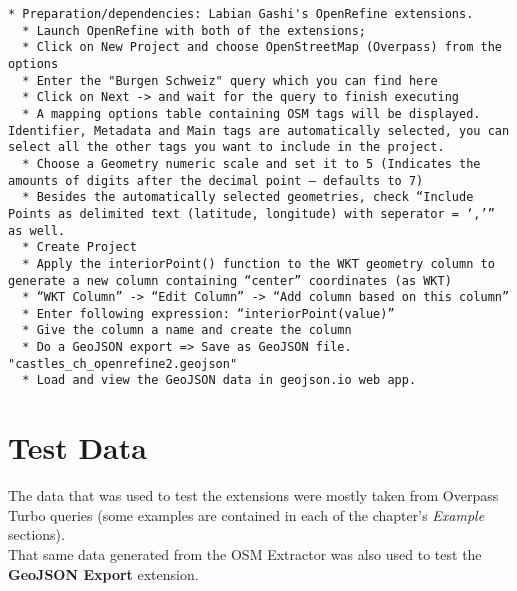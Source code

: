 \begin{verbatim}
* Preparation/dependencies: Labian Gashi's OpenRefine extensions.
  * Launch OpenRefine with both of the extensions;
  * Click on New Project and choose OpenStreetMap (Overpass) from the options
  * Enter the "Burgen Schweiz" query which you can find here
  * Click on Next -> and wait for the query to finish executing
  * A mapping options table containing OSM tags will be displayed. Identifier, Metadata and Main tags are automatically selected, you can select all the other tags you want to include in the project.
  * Choose a Geometry numeric scale and set it to 5 (Indicates the amounts of digits after the decimal point – defaults to 7)
  * Besides the automatically selected geometries, check “Include Points as delimited text (latitude, longitude) with seperator = ‘,’” as well.
  * Create Project
  * Apply the interiorPoint() function to the WKT geometry column to generate a new column containing “center” coordinates (as WKT)
  * “WKT Column” -> “Edit Column” -> “Add column based on this column”
  * Enter following expression: “interiorPoint(value)”
  * Give the column a name and create the column
  * Do a GeoJSON export => Save as GeoJSON file. "castles_ch_openrefine2.geojson"
  * Load and view the GeoJSON data in geojson.io web app.
\end{verbatim}
\section{Test Data}
The data that was used to test the extensions were mostly taken from Overpass
Turbo queries (some examples are contained in each of the chapter's
\textit{Example} sections).\\
\newline
That same data generated from the OSM Extractor was also used to test the \textbf{GeoJSON Export}
extension.